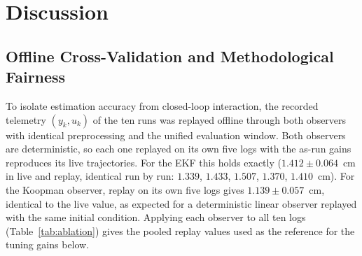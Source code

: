 \documentclass[asi,article,accept,pdftex,moreauthors]{Definitions/mdpi}
\begin{document}
\section{Discussion}
\label{sec:discussion}

\subsection{Offline Cross-Validation and Methodological Fairness}
\label{sec:tuning_cv}

{To isolate estimation accuracy from closed-loop interaction, the recorded telemetry $(y_k,u_k)$ of the ten runs was replayed offline through both observers with identical preprocessing and the unified evaluation window. Both observers are deterministic, so each one replayed on its own five logs with the as-run gains reproduces its live trajectories. For the EKF this holds exactly ($1.412\pm0.064$~cm in live and replay, identical run by run: $1.339$, $1.433$, $1.507$, $1.370$, $1.410$~cm). For the Koopman observer, replay on its own five logs gives $1.139\pm0.057$~cm, identical to the live value, as expected for a deterministic linear observer replayed with the same initial condition. Applying each observer to all ten logs (Table~\ref{tab:ablation}) gives the pooled replay values used as the reference for the tuning gains below.}
\end{document}
